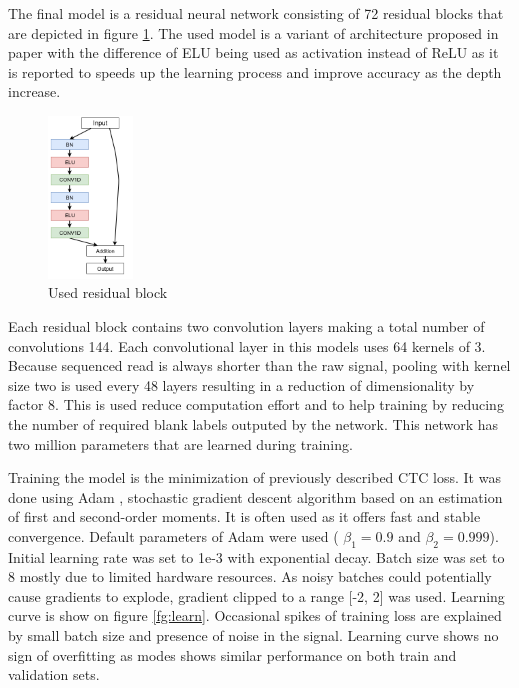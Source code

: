 \documentclass[times, utf8, diplomski, numeric, english]{fer}
\begin{document}
The final model is a residual neural network consisting of 72 residual blocks that are depicted in figure \ref{fg:model_block}. The used model is a variant of architecture proposed in paper \cite{identitet} with the difference of ELU being used as activation instead of ReLU as it is reported \cite{resnet-elu} to speeds up the learning process and improve accuracy as the depth increase.
\begin{figure}[!ht]
	\begin{center}
		\includegraphics[width=0.2\textwidth]{./imgs/model.png}
		\caption{Used residual block}
		\label{fg:model_block}
	\end{center}
\end{figure} 

Each residual block contains two convolution layers making a total number of convolutions 144. Each convolutional layer in this models uses 64 kernels of 3. Because sequenced read is always shorter than the raw signal, pooling with kernel size two is used every 48 layers resulting in a reduction of dimensionality by factor 8. This is used reduce computation effort and to help training by reducing the number of required blank labels outputed by the network. This network has two million parameters that are learned during training. 

Training the model is the minimization of previously described CTC loss. It was done using Adam \cite{adam}, stochastic gradient descent algorithm based on an estimation of first and second-order moments.
It is often used as it offers fast and stable convergence. Default parameters of Adam were used (
$\beta_1=0.9$ and $\beta_2=0.999$). Initial learning rate was set to 1e-3 with exponential decay. Batch size was set to 8 mostly due to limited hardware resources. As noisy batches could potentially cause gradients to explode, gradient clipped to a range [-2, 2] was used.
Learning curve is show on figure \ref{fg:learn}. Occasional spikes of training loss are explained by small batch size and presence of noise in the signal. Learning curve shows no sign of overfitting as modes shows similar performance on both train and validation sets.
\end{document}
